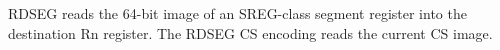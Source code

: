 RDSEG reads the 64-bit image of an SREG-class segment register into the destination Rn register. The RDSEG CS encoding reads the current CS image.
